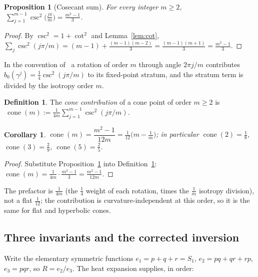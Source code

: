 \documentclass[12pt, letterpaper]{article}
\theoremstyle{definition}
\newtheorem{definition}{Definition}[section]
\theoremstyle{plain}
\newtheorem{proposition}[theorem]{Proposition}
\newtheorem{corollary}[theorem]{Corollary}
\begin{document}
\begin{proposition}[Cosecant sum]\label{prop:csc}
For every integer $m\ge2$, $\ \displaystyle\sum_{j=1}^{m-1}\csc^2\!\Big(\tfrac{j\pi}{m}\Big)=\tfrac{m^2-1}{3}$.
\end{proposition}

\begin{proof}
By $\csc^2=1+\cot^2$ and Lemma~\ref{lem:cot}, $\sum_j\csc^2(j\pi/m)=(m-1)+\tfrac{(m-1)(m-2)}{3}=\tfrac{(m-1)(m+1)}{3}=\tfrac{m^2-1}{3}$.
\end{proof}

In the convention of~\cite{dggw2008} a rotation of order $m$ through angle $2\pi j/m$ contributes $b_0(\gamma^j)=\tfrac14\csc^2(j\pi/m)$ to its fixed-point stratum, and the stratum term is divided by the isotropy order $m$.

\begin{definition}\label{def:cone}
The \emph{cone contribution} of a cone point of order $m\ge2$ is
$\ \operatorname{cone}(m):=\tfrac{1}{4m}\sum_{j=1}^{m-1}\csc^2(j\pi/m)$.
\end{definition}

\begin{corollary}\label{cor:conevals}
$\operatorname{cone}(m)=\dfrac{m^2-1}{12m}=\tfrac1{12}\big(m-\tfrac1m\big)$; in particular $\operatorname{cone}(2)=\tfrac18$, $\operatorname{cone}(3)=\tfrac29$, $\operatorname{cone}(5)=\tfrac25$.
\end{corollary}

\begin{proof}
Substitute Proposition~\ref{prop:csc} into Definition~\ref{def:cone}: $\operatorname{cone}(m)=\tfrac{1}{4m}\cdot\tfrac{m^2-1}{3}=\tfrac{m^2-1}{12m}$.
\end{proof}

The prefactor is $\tfrac1{4m}$ (the $\tfrac14$ weight of each rotation, times the $\tfrac1m$ isotropy division), not a flat $\tfrac1{12}$; the contribution is curvature-independent at this order, so it is the same for flat and hyperbolic cones.

\subsection{Three invariants and the corrected inversion}
\label{sec:inversion}

Write the elementary symmetric functions $e_1=p+q+r=S_1$, $e_2=pq+qr+rp$, $e_3=pqr$, so $R=e_2/e_3$. The heat expansion supplies, in order:
\end{document}
